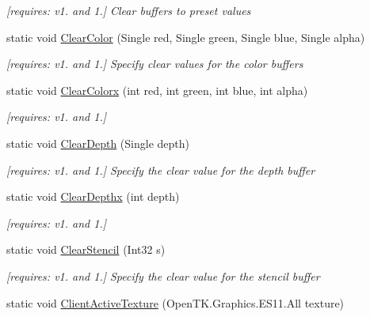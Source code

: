 \begin{DoxyCompactItemize}
\begin{DoxyCompactList}\small\item\em \mbox{[}requires\-: v1. and 1.\mbox{]} Clear buffers to preset values \end{DoxyCompactList}\item 
static void \hyperlink{class_open_t_k_1_1_graphics_1_1_e_s11_1_1_g_l_a3d3fd5eabc61e25dd654fa36c831a620}{Clear\-Color} (Single red, Single green, Single blue, Single alpha)
\begin{DoxyCompactList}\small\item\em \mbox{[}requires\-: v1. and 1.\mbox{]} Specify clear values for the color buffers \end{DoxyCompactList}\item 
static void \hyperlink{class_open_t_k_1_1_graphics_1_1_e_s11_1_1_g_l_a1faa85991264c13391d636112a239384}{Clear\-Colorx} (int red, int green, int blue, int alpha)
\begin{DoxyCompactList}\small\item\em \mbox{[}requires\-: v1. and 1.\mbox{]}\end{DoxyCompactList}\item 
static void \hyperlink{class_open_t_k_1_1_graphics_1_1_e_s11_1_1_g_l_a3394befa8f65d8c11dc293a0a13d1300}{Clear\-Depth} (Single depth)
\begin{DoxyCompactList}\small\item\em \mbox{[}requires\-: v1. and 1.\mbox{]} Specify the clear value for the depth buffer \end{DoxyCompactList}\item 
static void \hyperlink{class_open_t_k_1_1_graphics_1_1_e_s11_1_1_g_l_a24ec186a243c80bb3fc6fa43e16ac708}{Clear\-Depthx} (int depth)
\begin{DoxyCompactList}\small\item\em \mbox{[}requires\-: v1. and 1.\mbox{]}\end{DoxyCompactList}\item 
static void \hyperlink{class_open_t_k_1_1_graphics_1_1_e_s11_1_1_g_l_a9e8b3497773e2d3ee3a655661ef6c2e9}{Clear\-Stencil} (Int32 s)
\begin{DoxyCompactList}\small\item\em \mbox{[}requires\-: v1. and 1.\mbox{]} Specify the clear value for the stencil buffer \end{DoxyCompactList}\item 
static void \hyperlink{class_open_t_k_1_1_graphics_1_1_e_s11_1_1_g_l_acf533a25734a701984d66ff5bab44343}{Client\-Active\-Texture} (Open\-T\-K.\-Graphics.\-E\-S11.\-All texture)

\end{DoxyCompactItemize}
